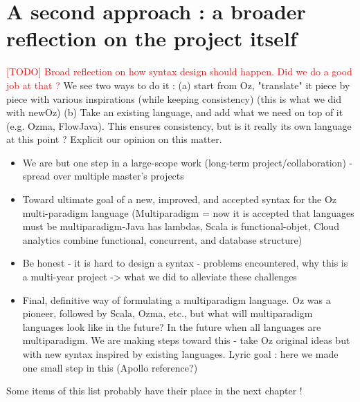 \section{A second approach : a broader reflection on the project itself}\label{sec:ch4-reflection}
\textcolor{red}{[TODO] Broad reflection on how syntax design should happen. Did we do a good job at that ?}
We see two ways to do it :  (a) start from Oz, "translate" it piece by piece with various inspirations (while keeping consistency) (this is what we did with newOz) (b) Take an existing language, and add what we need on top of it (e.g. Ozma, FlowJava). This ensures consistency, but is it really its own language at this point ?
Explicit our opinion on this matter.

\begin{itemize}
\item We are but one step in a large-scope work (long-term project/collaboration) - spread over multiple master's projects
\item Toward ultimate goal of a new, improved, and accepted syntax for the Oz multi-paradigm language (Multiparadigm = now it is accepted that languages must be multiparadigm-Java has lambdas, Scala is functional-objet, Cloud analytics combine functional, concurrent, and database structure)
\item Be honest - it is hard to design a syntax - problems encountered, why this is a multi-year project -> what we did to alleviate these challenges
\item Final, definitive way of formulating a multiparadigm language.  Oz was a pioneer, followed by Scala, Ozma, etc., but what will multiparadigm languages look like in the future?  In the future when all languages are multiparadigm. We are making steps toward this - take Oz original ideas but with new syntax inspired by existing languages. Lyric goal : here we made one small step in this (Apollo reference?)
\end{itemize}
Some items of this list probably have their place in the next chapter !